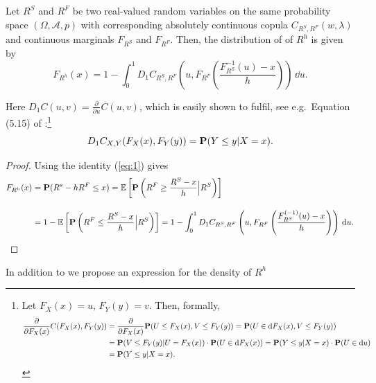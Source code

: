 \documentclass[11pt,a4paper,english]{article}
\begin{document}
\begin{proposition}
  \label{prop:dfrh}
  Let $R^S$ and $R^F$ be two real-valued random variables on the same
  probability space $(\Omega, \mathcal A, p)$ with corresponding
  absolutely continuous copula $C_{R^S, R^F}(w,\lambda)$ and
  continuous marginals $F_{R^S}$ and $F_{R^F}$. Then, the distribution
  of of $R^h$ is given by
  \begin{equation}
    \label{eq:3}
    F_{R^h}(x) = 1- \int^1_0 D_1 C_{R^S, R^F}
    \left( u, F_{R^F} \left( \frac{F^{-1}_{R^S}(u)-x}{h} \right)
    \right)\, \dd u.
  \end{equation}
\end{proposition}\medskip
Here $D_1 C(u,v)=\displaystyle \frac{\partial}{\partial u} C(u,v)$,
which is easily shown to fulfil, see e.g.\ Equation (5.15) of
\citep{McNeil2005}:\footnote{%
  Let $F_X(x)=u$, $F_Y(y)=v$. Then, formally,
  \begin{align*}
    \frac{\partial}{\partial F_X(x)} C(F_X(x), F_Y(y)) %
    &= \frac{\partial}{\partial F_X(x)} \p(U\leq F_X(x),
      V\leq F_Y(y)) %
      = \p(U\in \dd F_X(x), V\leq F_Y(y))\\ %
    &= \p(V\leq F_Y(y)| U = F_X(x))\cdot \p(U \in \dd
      F_X(x)) %
      = \p(Y\leq y|X=x)\cdot \p(U\in \dd u)\\ %
    &= \p(Y\leq y|X=x).
  \end{align*}}
\begin{equation}
  \label{eq:1}
  D_1 C_{X,Y}(F_X(x), F_Y(y)) = {\bf P}(Y\leq y|X=x).
\end{equation}
\begin{proof}
  Using the identity (\ref{eq:1}) gives
  \begin{align*}
    F_{R^h}(x) &= \p(R^s - h R^F\leq x) %
                 = \E\left[\p\left(R^F\geq \frac{R^S-x}{h}\Big|
                 R^S\right)\right]\\[10pt]
               &= 1-\E\left[\p\left(R^F\leq \frac{R^S-x}{h}\Big|
                 R^S\right)\right]%
               = 1- \int_0^1 D_1 C_{R^S, R^F}\left(u,
                 F_{R^F}\left(\frac{F^{(-1)}_{R^S}(u) -
                 x}{h}\right)\right)\, \dd u.
  \end{align*}
\end{proof}\medskip

In addition to \cite{barbi2014copula} we propose an expression for the density of $R^h$
\end{document}
